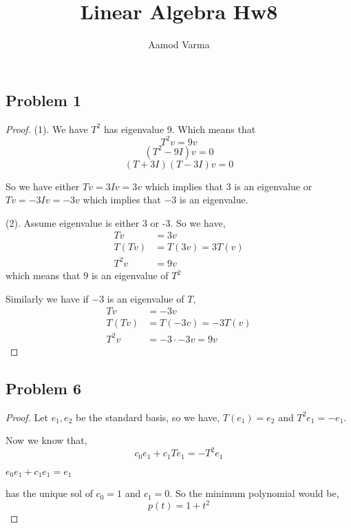 \documentclass[a4paper]{report}
\title{Linear Algebra Hw8}
\author{Aamod Varma}
\begin{document}
\maketitle
\date{}

\subsection*{Problem 1}
\begin{proof}
   (1). We have $T^2$ has eigenvalue 9. Which means that 
   $$ T^2 v = 9 v $$ 
   $$ (T^2 - 9I)v = 0 $$ 
   $$ (T + 3I)(T - 3I)v = 0 $$ 

   So we have either $Tv = 3Iv = 3v$ which implies that 3 is an eigenvalue or $Tv = -3Iv = -3v$ which implies that $-3$ is an eigenvalue.

   (2). Assume eigenvalue is either 3 or -3. So we have, 
   \begin{align*}
      Tv &= 3v\\
      T(Tv) &= T(3v) = 3T(v)\\
      T^2 v &=  9v
   \end{align*}
   which means that $9$ is an eigenvalue of $T^2$

   Similarly we have if $-3$ is an eigenvalue of $T$, 
   \begin{align*}
      Tv &= -3v\\
      T(Tv) &= T(-3v) = -3T(v)\\
      T^2 v &=  -3 \cdot -3 v = 9v
   \end{align*}
\end{proof}


\subsection*{Problem 6}
\begin{proof}
   Let $e_1,e_2$ be the standard basis, so we have, $T(e_1) = e_2$ and $T^2e_1 = -e_1$.

   Now we know that, 
   $$ c_0e_1 + c_1Te_1 = -T^2e_1 $$ 

   $e_0e_1 + c_1e_1 = e_1$ 

   has the unique sol of $c_0 = 1$ and $c_1 = 0$.  So the minimum polynomial would be, 
   $$ p(t) = 1 + t^2 $$ 
\end{proof}
\end{document}
